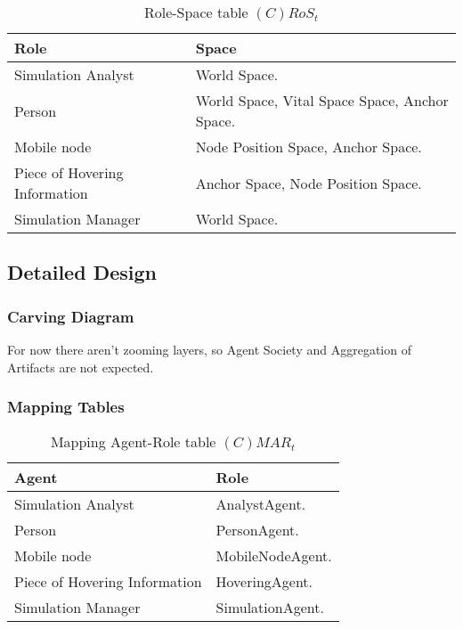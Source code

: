 \begin{table}[H]
	\centering
	\begin{tabular}{|p{4cm}|p{8cm}|}
			\hline
			\textbf{Role} & \textbf{Space} \\
			\hline
			Simulation Analyst & World Space. \\
			\hline
			Person & World Space, Vital Space Space, Anchor Space. \\
			\hline
			Mobile node & Node Position Space, Anchor Space. \\
			\hline
			Piece of Hovering Information & Anchor Space, Node Position Space. \\
			\hline
			Simulation Manager & World Space. \\
			\hline
		\end{tabular}
	\caption{Role-Space table $(C)RoS_t$}
	\label{tab:cost}
\end{table}


\subsection{Detailed Design}

\subsubsection{Carving Diagram}

For now there aren't zooming layers, so Agent Society and Aggregation of
Artifacts are not expected.

\subsubsection{Mapping Tables}

\begin{table}[H]
	\centering
	\begin{tabular}{|p{4cm}|p{8cm}|}
			\hline
			\textbf{Agent} & \textbf{Role} \\
			\hline
			Simulation Analyst & AnalystAgent. \\
			\hline
			Person & PersonAgent. \\
			\hline
			Mobile node & MobileNodeAgent.  \\
			\hline
			Piece of Hovering Information & HoveringAgent. \\
			\hline
			Simulation Manager & SimulationAgent. \\
			\hline
		\end{tabular}
	\caption{Mapping Agent-Role table $(C)MAR_t$}
	\label{tab:cmart}
\end{table}

